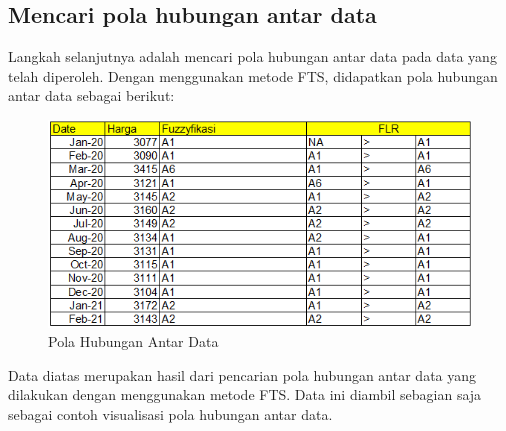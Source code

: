 \documentclass[conference]{IEEEtran}
\begin{document}
\subsection{Mencari pola hubungan antar data}
Langkah selanjutnya adalah mencari pola hubungan antar data pada data yang telah diperoleh. Dengan menggunakan metode FTS, didapatkan pola hubungan antar data sebagai berikut:
\begin{figure}[H]
    \centering
    \includegraphics[scale=0.5]{images/Pola data.png} 
    \caption{Pola Hubungan Antar Data}
\end{figure}
Data diatas merupakan hasil dari pencarian pola hubungan antar data yang dilakukan dengan menggunakan metode FTS. Data ini diambil sebagian saja sebagai contoh visualisasi pola hubungan antar data.
\end{document}
